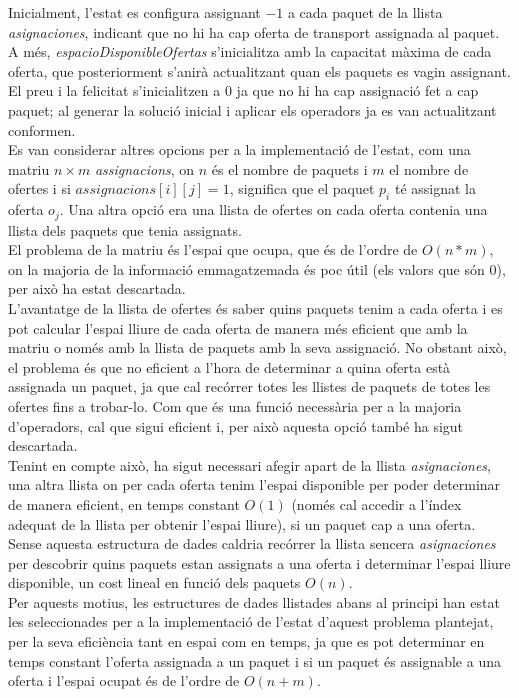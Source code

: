 \documentclass[a4paper]{article}
\begin{document}
	Inicialment, l'estat es configura assignant $-1$ a cada paquet de la llista \emph{asignaciones}, indicant que no hi ha cap oferta de transport assignada al paquet. A més, \emph{espacioDisponibleOfertas} s'inicialitza amb la capacitat màxima de cada oferta, que posteriorment s'anirà actualitzant quan els paquets es vagin assignant. El preu i la felicitat s'inicialitzen a $0$ ja que no hi ha cap assignació fet a cap paquet; al generar la solució inicial i aplicar els operadors ja es van actualitzant conformen.\\
	Es van considerar altres opcions per a la implementació de l'estat, com una matriu $n \times m$ \textit{assignacions}, on $n$ és el nombre de paquets i $m$ el nombre de ofertes i si $assignacions[i][j] = 1$, significa que el paquet $p_i$ té assignat la oferta $o_j$. Una altra opció era una llista de ofertes on cada oferta contenia una llista dels paquets que tenia assignats.\\
	El problema de la matriu és l'espai que ocupa, que és de l'ordre de $O(n*m)$, on la majoria de la informació emmagatzemada és poc útil (els valors que són 0), per això ha estat descartada.\\
	L'avantatge de la llista de ofertes és saber quins paquets tenim a cada oferta i es pot calcular l'espai lliure de cada oferta de manera més eficient que amb la matriu o només amb la llista de paquets amb la seva assignació. No obstant això, el problema és que no eficient a l'hora de determinar a quina oferta està assignada un paquet, ja que cal recórrer totes les llistes de paquets de totes les ofertes fins a trobar-lo. Com que és una funció necessària per a la majoria d'operadors, cal que sigui eficient i, per això aquesta opció també ha sigut descartada.\\
	Tenint en compte això, ha sigut necessari afegir apart de la llista \textit{asignaciones}, una altra llista on per cada oferta tenim l'espai disponible per poder determinar de manera eficient, en temps constant $O(1)$ (només cal accedir a l'índex adequat de la llista per obtenir l'espai lliure), si un paquet cap a una oferta. Sense aquesta estructura de dades caldria recórrer la llista sencera \textit{asignaciones} per descobrir quins paquets estan assignats a una oferta i determinar l'espai lliure disponible, un cost lineal en funció dels paquets $O(n)$.\\
	Per aquests motius, les estructures de dades llistades abans al principi han estat les seleccionades per a la implementació de l'estat d'aquest problema plantejat, per la seva eficiència tant en espai com en temps, ja que es pot determinar en temps constant l'oferta assignada a un paquet i si un paquet és assignable a una oferta i l'espai ocupat és de l'ordre de $O(n + m)$.
	
\end{document}

